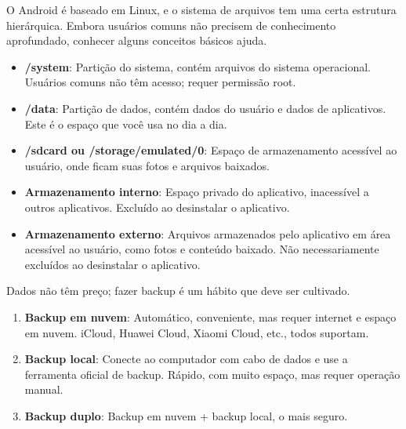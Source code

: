 
O Android é baseado em Linux, e o sistema de arquivos tem uma certa estrutura hierárquica. Embora usuários comuns não precisem de conhecimento aprofundado, conhecer alguns conceitos básicos ajuda.


\begin{itemize}
  \item \textbf{/system}: Partição do sistema, contém arquivos do sistema operacional. Usuários comuns não têm acesso; requer permissão root.
  \item \textbf{/data}: Partição de dados, contém dados do usuário e dados de aplicativos. Este é o espaço que você usa no dia a dia.
  \item \textbf{/sdcard ou /storage/emulated/0}: Espaço de armazenamento acessível ao usuário, onde ficam suas fotos e arquivos baixados.
\end{itemize}


\begin{itemize}
  \item \textbf{Armazenamento interno}: Espaço privado do aplicativo, inacessível a outros aplicativos. Excluído ao desinstalar o aplicativo.
  \item \textbf{Armazenamento externo}: Arquivos armazenados pelo aplicativo em área acessível ao usuário, como fotos e conteúdo baixado. Não necessariamente excluídos ao desinstalar o aplicativo.
\end{itemize}


Dados não têm preço; fazer backup é um hábito que deve ser cultivado.


\begin{enumerate}
  \item \textbf{Backup em nuvem}: Automático, conveniente, mas requer internet e espaço em nuvem. iCloud, Huawei Cloud, Xiaomi Cloud, etc., todos suportam.
  \item \textbf{Backup local}: Conecte ao computador com cabo de dados e use a ferramenta oficial de backup. Rápido, com muito espaço, mas requer operação manual.
  \item \textbf{Backup duplo}: Backup em nuvem + backup local, o mais seguro.
\end{enumerate}

